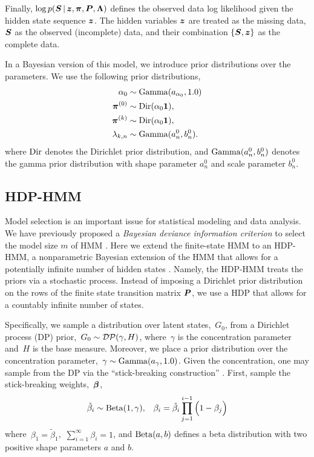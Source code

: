 Finally, $\log p(\boldsymbol{S} \,|\, \boldsymbol{z}, \boldsymbol{\pi}, \boldsymbol{P}, \boldsymbol{\Lambda})$ defines the observed data log
likelihood given the hidden state sequence $\boldsymbol{z}$.
The hidden variables $\boldsymbol{z}$ are treated as the
missing data, ${\boldsymbol{S}}$ as the observed (incomplete) data, and
their combination $\{\boldsymbol{S}, \boldsymbol{z}\}$ as the complete data.

In a Bayesian version of this model,  we introduce prior distributions over
the parameters. We use the following prior distributions,
\begin{align}
\alpha_0 &\sim \mathrm{Gamma}(a_{\alpha_0}, 1.0) \\
\nonumber \boldsymbol{\pi}^{(0)} &\sim \mathrm{Dir}(\alpha_0\boldsymbol{1}),\\
\nonumber \boldsymbol{\pi}^{(k)} &\sim \mathrm{Dir}(\alpha_0\boldsymbol{1}), \\
\nonumber \lambda_{k,n} &\sim \mathrm{Gamma}(a_n^0,b_n^0).
\end{align}
where $\mathrm{Dir}$ denotes the Dirichlet prior distribution, and
$\mathrm{Gamma}(a_n^0,b_n^0)$ denotes the gamma prior distribution with
shape parameter $a_n^0$ and scale parameter $b_n^0$.

\subsection{HDP-HMM}

Model selection is an important issue for statistical modeling and
data analysis.  We have previously proposed a {\em Bayesian deviance
  information criterion} to select the model size $m$ of HMM
\citep{Chen12a,Chen14}. Here we extend the finite-state HMM to an
HDP-HMM, a nonparametric Bayesian extension of the HMM that allows for
a potentially infinite number of hidden states \citep{Teh06,
  Beal02}. Namely, the HDP-HMM treats the priors via a stochastic
process. Instead of imposing a Dirichlet prior distribution on the
rows of the finite state transition matrix $\boldsymbol{P}$, we use a HDP that
allows for a countably infinite number of states.

Specifically, we sample a distribution over latent states,~$G_0$, from
a Dirichlet process (DP) \citep{Ferguson73}
prior,~${G_0\sim \mathcal{DP}(\gamma,H)}$, where~$\gamma$ is the
concentration parameter and~$H$ is the base measure.  Moreover, we
place a prior distribution over the concentration parameter,~$\gamma
\sim \mathrm{Gamma}(a_{\gamma}, 1.0)$.  Given the concentration, one may
sample from the DP via the ``stick-breaking construction''
\citep{Sethuraman94}. First, sample the stick-breaking
weights,~$\boldsymbol{\beta}$,
\begin{eqnarray}                                   
\tilde{\beta}_{i}\sim \mathrm{Beta}(1,\gamma), \;\;\; \beta_{i}=\tilde{\beta}_{i}\prod_{j=1}^{i-1}\Big(1-\beta_{j}\Big)
\label{stick1}
\end{eqnarray}
where~$\beta_1 = \tilde{\beta}_1$,~$\sum_{i=1}^\infty \beta_{i}=1$,
and $\mathrm{Beta}(a,b)$ defines a beta distribution with two positive
shape parameters $a$ and $b$.

